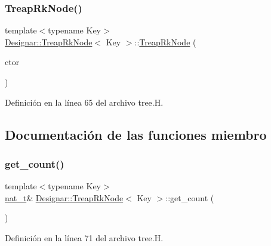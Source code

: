 \subsubsection{\texorpdfstring{Treap\+Rk\+Node()}{TreapRkNode()}\hspace{0.1cm}{\footnotesize\ttfamily [4/4]}}
{\footnotesize\ttfamily template$<$typename Key$>$ \\
\hyperlink{class_designar_1_1_treap_rk_node}{Designar\+::\+Treap\+Rk\+Node}$<$ Key $>$\+::\hyperlink{class_designar_1_1_treap_rk_node}{Treap\+Rk\+Node} (\begin{DoxyParamCaption}\item[{\hyperlink{namespace_designar_a679bc99fd69a3601faa5d6d47f865106}{Bin\+Tree\+Node\+Ctor}}]{ctor }\end{DoxyParamCaption})\hspace{0.3cm}{\ttfamily [inline]}}



Definición en la línea 65 del archivo tree.\+H.



\subsection{Documentación de las funciones miembro}
\mbox{\label{class_designar_1_1_treap_rk_node_a4396d6cb73dc8df8cdae3a94565995ef}} 
\subsubsection{\texorpdfstring{get\+\_\+count()}{get\_count()}}
{\footnotesize\ttfamily template$<$typename Key$>$ \\
\hyperlink{namespace_designar_aa72662848b9f4815e7bf31a7cf3e33d1}{nat\+\_\+t}\& \hyperlink{class_designar_1_1_treap_rk_node}{Designar\+::\+Treap\+Rk\+Node}$<$ Key $>$\+::get\+\_\+count (\begin{DoxyParamCaption}{ }\end{DoxyParamCaption})\hspace{0.3cm}{\ttfamily [inline]}}



Definición en la línea 71 del archivo tree.\+H.

\mbox{\label{class_designar_1_1_treap_rk_node_add770a59cfec151c17ac9f665d3ceb2f}} 
